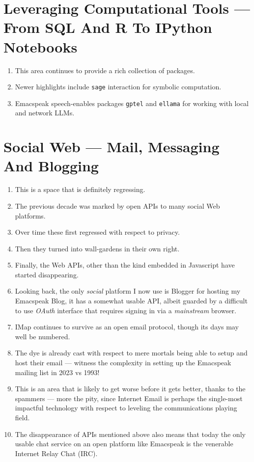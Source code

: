 \documentclass[11pt]{article}
\begin{document}
\section{Leveraging Computational Tools —  From SQL And R To IPython Notebooks}
\label{sec:org96ce2f3}

\begin{enumerate}
\item This area continues to provide a rich collection of  packages.
\item Newer highlights include \texttt{sage} interaction for symbolic computation.
\item Emacspeak speech-enables  packages  \texttt{gptel} and \texttt{ellama} for working
with local and network LLMs.
\end{enumerate}
\section{Social Web  — Mail, Messaging And Blogging}
\label{sec:orge63a4a4}

\begin{enumerate}
\item This is a space that is definitely regressing.
\item The previous decade was marked by open APIs to many social Web platforms.
\item Over time these first regressed with respect to privacy.
\item Then they turned into wall-gardens in their own right.
\item Finally, the Web APIs, other than the kind embedded in Javascript have
started disappearing.
\item Looking back, the only \emph{social} platform I now use is Blogger for
hosting my Emacspeak Blog, it has a somewhat usable API, albeit
guarded by a difficult to use \emph{OAuth} interface that requires 
signing   in via  a \emph{mainstream} browser.
\item IMap continues to survive as an open email protocol, though its
days may well be numbered.
\item The dye is already cast with respect to mere mortals being able
to setup and  host their email ---  witness the complexity in setting
up the Emacspeak mailing list in 2023 vs 1993!
\item This is an area that is  likely to get worse before it gets
better,  thanks to the spammers  --- more the pity, since Internet Email is perhaps the
single-most impactful technology with respect to leveling the
communications playing field.
\item The disappearance of APIs mentioned above also means that today
the only usable chat service on an open platform like Emacspeak
is the venerable  Internet Relay Chat (IRC).
\end{enumerate}
\end{document}

